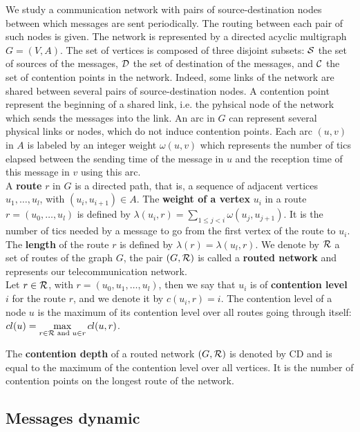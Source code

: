 \documentclass[english]{article}
\begin{document}
  We study a communication network with pairs of source-destination nodes between which messages are sent periodically. The routing between each  pair of such nodes is given. The network is represented by a directed acyclic multigraph $G=(V,A)$. The set of vertices is composed of three disjoint subsets:  ${\cal S}$ the set of sources of the messages, ${\cal D}$ the set of destination of the messages, and ${\cal C}$ the set of contention points in the network. Indeed, some links of the network are shared between several pairs of source-destination nodes. A contention point represent the beginning of a shared link, i.e. the pyhsical node of the network which sends the messages into the link. An arc in $G$ can represent several physical links or nodes, which do not induce contention points. Each arc  $(u,v)$ in $A$ is labeled by an integer weight $\omega(u,v)$ which represents the number of tics elapsed between the sending time of the message in $u$ and the reception time of this message in $v$ using this arc. \\
  A {\bf route} $r$ in $G$ is a directed path, that is, a sequence of adjacent vertices $u_1, \ldots , u_{l}$, with $(u_i,u_{i+1}) \in A$.  The 	{\bf weight of a vertex} $u_i$ in a route $r=(u_0,\dots,u_l)$ is defined by $\lambda(u_i,r)= \sum\limits_{1 \leq j <i} \omega(u_j, u_{j+1})$. It is the number of tics needed by a message to go from the first vertex of the route to $u_i$. The \textbf{length} of the route $r$ is defined by $\lambda (r)= \lambda (u_l,r)$.
	We denote by ${\cal R}$ a set of routes of the graph $G$, the pair $(G,{\cal R})$ is called a \textbf{routed network} and represents our telecommunication network.\\
	Let $r \in {\cal R}$, with $r = (u_0,u_1,\dots,u_l)$, then we say that $u_i$ is of \textbf{contention level} $i$ for the route $r$, and we denote it by $c(u_i,r) = i$. The contention level of a node $u$ is the maximum of its contention level over all routes going through itself: 
	$cl(u) = \max\limits_{r\in{\cal R} \text{ and } u \in r} cl(u,r)$.


	The  \textbf{contention depth} of a routed network $(G,{\cal R})$ is denoted by \textsc{CD} and is equal to the maximum of the contention level over all vertices. It is the number of contention points on the longest route of the network. 


 \subsection{Messages dynamic}
	     
\end{document}

